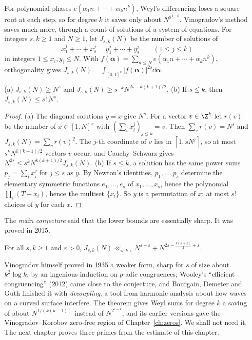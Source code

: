 For polynomial phases $e(\alpha_1n+\cdots+\alpha_kn^k)$, Weyl's differencing loses a square root at each step, so for degree $k$ it saves only about $N^{2^{1-k}}$. Vinogradov's method saves much more, through a count of solutions of a system of equations. For integers $s,k\ge1$ and $N\ge1$, let $J_{s,k}(N)$ be the number of solutions of
\[
x_1^j+\cdots+x_s^j=y_1^j+\cdots+y_s^j\qquad(1\le j\le k)
\]
in integers $1\le x_i,y_i\le N$. With $f(\boldsymbol\alpha)=\sum_{n\le N}e(\alpha_1n+\cdots+\alpha_kn^k)$, orthogonality gives $J_{s,k}(N)=\int_{[0,1]^k}|f(\boldsymbol\alpha)|^{2s}\dd\boldsymbol\alpha$.

\begin{proposition}\label{prop:vmvtbounds}
(a) $J_{s,k}(N)\ge N^s$ and $J_{s,k}(N)\ge s^{-k}N^{2s-k(k+1)/2}$.
(b) If $s\le k$, then $J_{s,k}(N)\le s!\,N^s$.
\end{proposition}
\begin{proof}
(a) The diagonal solutions $y=x$ give $N^s$. For a vector $v\in\Z^k$ let $r(v)$ be the number of $x\in[1,N]^s$ with $(\sum_ix_i^j)_{j\le k}=v$. Then $\sum_vr(v)=N^s$ and $J_{s,k}(N)=\sum_vr(v)^2$. The $j$-th coordinate of $v$ lies in $[1,sN^j]$, so at most $s^kN^{k(k+1)/2}$ vectors $v$ occur, and Cauchy--Schwarz gives $N^{2s}\le s^kN^{k(k+1)/2}J_{s,k}(N)$.
(b) If $s\le k$, a solution has the same power sums $p_j=\sum_ix_i^j$ for $j\le s$ as $y$. By Newton's identities, $p_1,\dots,p_s$ determine the elementary symmetric functions $e_1,\dots,e_s$ of $x_1,\dots,x_s$, hence the polynomial $\prod_i(T-x_i)$, hence the multiset $\{x_i\}$. So $y$ is a permutation of $x$: at most $s!$ choices of $y$ for each $x$.
\end{proof}

The \emph{main conjecture} said that the lower bounds are essentially sharp. It was proved in 2015.

\begin{theorem}[Bourgain, Demeter, Guth; Wooley for $k=3$; quoted]\label{thm:vmvt}
For all $s,k\ge1$ and $\varepsilon>0$, $J_{s,k}(N)\ll_{s,k,\varepsilon}N^{s+\varepsilon}+N^{2s-\frac{k(k+1)}2+\varepsilon}$.
\end{theorem}

Vinogradov himself proved in 1935 a weaker form, sharp for $s$ of size about $k^2\log k$, by an ingenious induction on $p$-adic congruences; Wooley's ``efficient congruencing'' (2012) came close to the conjecture, and Bourgain, Demeter and Guth finished it with \emph{decoupling}, a tool from harmonic analysis about how waves on a curved surface interfere. The theorem gives Weyl sums for degree $k$ a saving of about $N^{1/(k(k-1))}$ instead of $N^{2^{1-k}}$, and its earlier versions gave the Vinogradov--Korobov zero-free region of Chapter~\ref{ch:zeros}. We shall not need it. The next chapter proves three primes from the estimate of this chapter.

